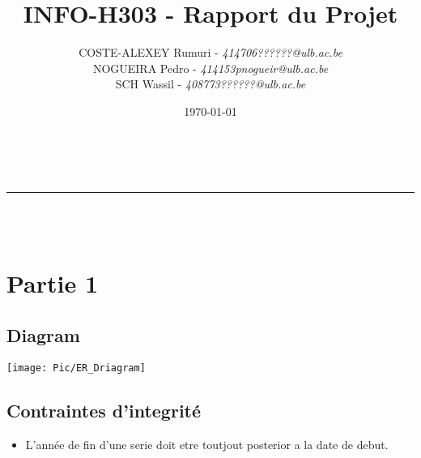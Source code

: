 \documentclass[12pt,a4paper]{article}
\makeatletter
\newcommand{\linha}{\rule{\linewidth}{0.4mm}}
\renewcommand{\maketitle}{
\begin{center}
\vspace{2ex}
{\huge\textsc{\@title}}
\vspace{1ex}\\
\linha\\
\@author\\\@date
\vspace{4ex}
\end{center}
}
\makeatother
\begin{document}
	\title{INFO-H303 - Rapport du Projet}
	\author{
		COSTE-ALEXEY Rumuri - \emph{414706}\hfill\textit{??????@ulb.ac.be}\\
		NOGUEIRA Pedro - \emph{414153}\hfill\textit{pnogueir@ulb.ac.be}\\
		SCH Wassil - \emph{408773}\hfill\textit{??????@ulb.ac.be}
	}
	\date{\today}
	\maketitle


	\section*{Partie 1}
		\subsection*{Diagram}
			\begin{center}
				\texttt{[image: Pic/ER\_Driagram]}
			\end{center}
		\subsection*{Contraintes d'integrité}
			\begin{itemize}
				\item L'année de fin d'une serie doit etre toutjout posterior a la date de debut.
			\end{itemize}
\end{document}
